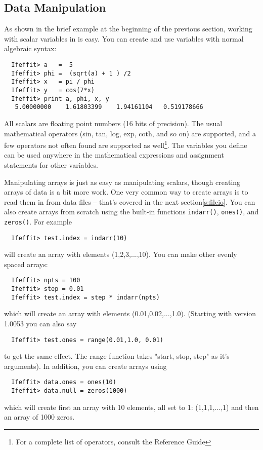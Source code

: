 \documentclass[11pt]{article}
\begin{document}
\subsection{Data Manipulation}\label{s:datatypes:manip}

As shown in the brief example at the beginning of the previous section,
working with scalar variables in {\ifeffit} is easy.  You can create and
use variables with normal algebraic syntax:
{\small\begin{verbatim}
  Ifeffit> a   =  5
  Ifeffit> phi =  (sqrt(a) + 1 ) /2
  Ifeffit> x   = pi / phi
  Ifeffit> y   = cos(7*x)
  Ifeffit> print a, phi, x, y
   5.00000000    1.61803399    1.94161104   0.519178666      
\end{verbatim}}\noindent
All scalars are floating point numbers (16 bits of precision).  The usual
mathematical operators (sin, tan, log, exp, coth, and so on) are supported,
and a few operators not often found are supported as well{\footnote{For a
    complete list of operators, consult the Reference Guide}}. The
variables you define can be used anywhere in the mathematical expressions
and assignment statements for other variables.

Manipulating arrays is just as easy as manipulating scalars, though
creating arrays of data is a bit more work.  One very common way to create
arrays is to read them in from data files -- that's covered in the next
section\ref{s:fileio}.  You can also create arrays from scratch using the
built-in functions {\tt{indarr()}}, {\tt{ones()}}, and {\tt{zeros()}}.  For
example
{\small\begin{verbatim}
  Ifeffit> test.index = indarr(10)
\end{verbatim}}\noindent
will create an array with elements (1,2,3,...,10).   You can 
make other evenly spaced arrays:
{\small\begin{verbatim}
  Ifeffit> npts = 100
  Ifeffit> step = 0.01
  Ifeffit> test.index = step * indarr(npts)
\end{verbatim}}\noindent
which will create an array with elements (0.01,0.02,...,1.0). 
(Starting with version 1.0053 you can also say
{\small\begin{verbatim}
  Ifeffit> test.ones = range(0.01,1.0, 0.01)
\end{verbatim}}\noindent
to get the same effect.  The range function takes "start, stop, step" as
it's arguments).  In addition, you can create arrays using 
{\small\begin{verbatim}
  Ifeffit> data.ones = ones(10)
  Ifeffit> data.null = zeros(1000)
\end{verbatim}}
\noindent
which will create first an array with 10 elements, all set to 1:
(1,1,1,...,1) and then an array of 1000 zeros.
\end{document}
